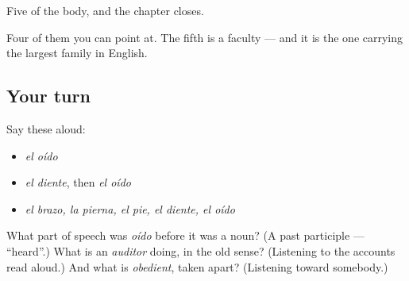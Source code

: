 \begin{grammarlens}[title={What you've built}]
Five of the body, and the chapter closes.

Four of them you can point at. The fifth is a faculty — and it is the one carrying the largest family in English.
\end{grammarlens}

\subsection*{Your turn}
Say these aloud:

\begin{itemize}
\raggedright
  \item \emph{el oído}
  \item \emph{el diente}, then \emph{el oído}
  \item \emph{el brazo, la pierna, el pie, el diente, el oído}
\end{itemize}

\begin{tcolorbox}[breakable,colback=teal!4,colframe=teal!35!black,title={Before you move on}]
What part of speech was \emph{oído} before it was a noun? (A past participle — \textquotedblleft{}heard\textquotedblright{}.) What is an \emph{auditor} doing, in the old sense? (Listening to the accounts read aloud.) And what is \emph{obedient}, taken apart? (Listening toward somebody.)
\end{tcolorbox}
